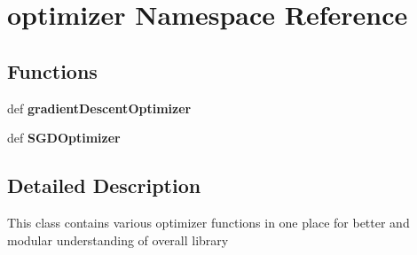 \hypertarget{namespaceoptimizer}{}\section{optimizer Namespace Reference}
\label{namespaceoptimizer}
\subsection*{Functions}
\begin{DoxyCompactItemize}
\item 
\mbox{\label{namespaceoptimizer_a48c6d644a7aa5617bff2641c83942606}} 
def {\bfseries gradient\+Descent\+Optimizer}
\item 
\mbox{\label{namespaceoptimizer_aad878d22126c7c40909d6b356e3bce0e}} 
def {\bfseries S\+G\+D\+Optimizer}
\end{DoxyCompactItemize}


\subsection{Detailed Description}
\begin{DoxyVerb}This class contains various optimizer functions in one place for better and modular understanding of overall library
\end{DoxyVerb}
 